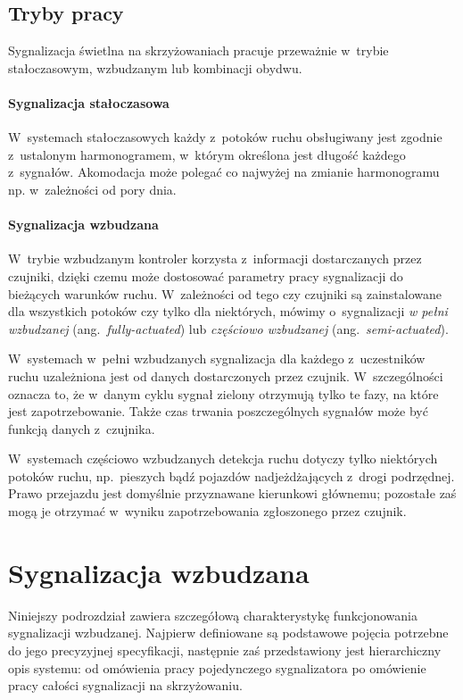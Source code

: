 \documentclass{pracamgr}
\newcommand{\ang}[1]{(ang.~\emph{#1})}
\theoremstyle{plain}
\begin{document}
\subsection{Tryby pracy}
\label{ss:tryby} Sygnalizacja świetlna na skrzyżowaniach pracuje
przeważnie w~trybie stałoczasowym, wzbudzanym lub kombinacji obydwu.

\paragraph{Sygnalizacja stałoczasowa} W~systemach stałoczasowych każdy
z~potoków ruchu obsługiwany jest zgodnie z~ustalonym harmonogramem,
w~którym określona jest długość każdego z~sygnałów. Akomodacja może
polegać co najwyżej na zmianie harmonogramu np. w~zależności od pory dnia.

\paragraph{Sygnalizacja wzbudzana}
W~trybie wzbudzanym kontroler korzysta z~informacji dostarczanych
przez czujniki, dzięki czemu może dostosować parametry pracy
sygnalizacji do bieżących warunków ruchu. W~zależności od tego czy
czujniki są zainstalowane dla wszystkich potoków czy tylko dla
niektórych, mówimy o~sygnalizacji \emph{w pełni wzbudzanej}
\ang{fully-actuated} lub \emph{częściowo wzbudzanej}
\ang{semi-actuated}.

W~systemach w~pełni wzbudzanych sygnalizacja dla każdego z~uczestników
ruchu uzależniona jest od danych dostarczonych przez czujnik.
W~szczególności oznacza to, że w~danym cyklu sygnał zielony otrzymują
tylko te fazy, na które jest zapotrzebowanie. Także czas trwania
poszczególnych sygnałów może być funkcją danych z~czujnika.

W~systemach częściowo wzbudzanych detekcja ruchu dotyczy tylko
niektórych potoków ruchu, np.~pieszych bądź pojazdów nadjeżdżających
z~drogi podrzędnej. Prawo przejazdu jest domyślnie przyznawane
kierunkowi głównemu; pozostałe zaś mogą je otrzymać w~wyniku
zapotrzebowania zgłoszonego przez czujnik.

\section{Sygnalizacja wzbudzana}
\label{s:sygn-szczegoly}

Niniejszy podrozdział zawiera szczegółową charakterystykę
funkcjonowania sygnalizacji wzbudzanej. Najpierw definiowane są
podstawowe pojęcia potrzebne do jego precyzyjnej specyfikacji,
następnie zaś przedstawiony jest hierarchiczny opis systemu: od
omówienia pracy pojedynczego sygnalizatora po omówienie pracy całości
sygnalizacji na skrzyżowaniu.
\end{document}
